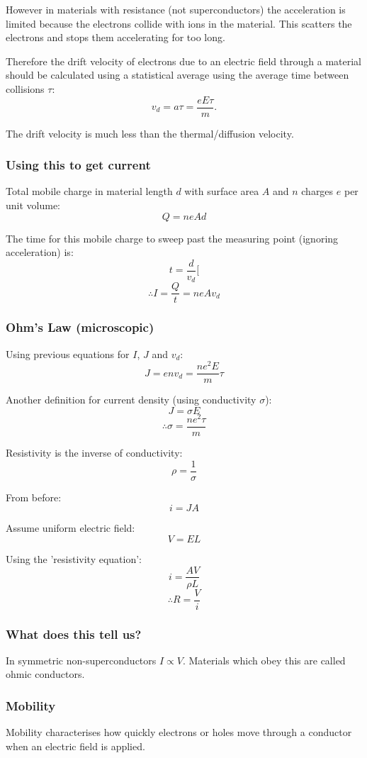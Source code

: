 \documentclass[11pt,a4paper]{report}
\begin{document}
However in materials with resistance (not superconductors) the acceleration is limited because the electrons collide with ions in the material. This scatters the electrons and stops them accelerating for too long.

Therefore the drift velocity of electrons due to an electric field through a material should be calculated using a statistical average using the average time between collisions $\tau$:
\[v_d = a\tau = \frac{eE\tau}{m}.\]

The drift velocity is much less than the thermal/diffusion velocity. 

\subsubsection{Using this to get current}
Total mobile charge in material length $d$ with surface area $A$ and $n$ charges $e$ per unit volume:
\[Q=neAd\]

The time for this mobile charge to sweep past the measuring point (ignoring acceleration) is:
\[t=\frac{d}{v_d}[\]
\[\therefore I = \frac{Q}{t} = neAv_d\]

\subsubsection{Ohm's Law (microscopic)}
Using previous equations for $I$, $J$ and $v_d$:
\[J = env_d=\frac{ne^2E}{m}\tau\]

Another definition for current density (using conductivity $\sigma$):
\[J=\sigma E\]
\[\therefore \sigma = \frac{ne^2\tau}{m}\]

Resistivity is the inverse of conductivity:
\[\rho = \frac{1}{\sigma}\]

From before:
\[i=JA\]

Assume uniform electric field:
\[V=EL\]

Using the 'resistivity equation':
\[i=\frac{AV}{\rho L}\]
\[\therefore R=\frac{V}{i}\]

\subsubsection{What does this tell us?}
In symmetric non-superconductors  $I \propto V$. Materials which obey this are called ohmic conductors.

\subsubsection{Mobility}
Mobility characterises how quickly electrons or holes move through a conductor when an electric field is applied. 
\end{document}
